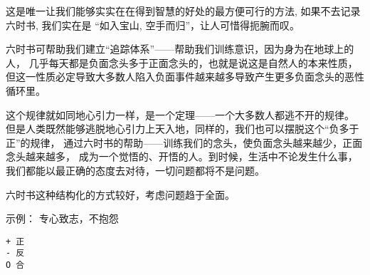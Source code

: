 \begin{tcolorbox}
这是唯一让我们能够实实在在得到智慧的好处的最方便可行的方法, 如果不去记录六时书, 
我们实在是 “如入宝山, 空手而归”，让人可惜得扼腕而叹。

六时书可帮助我们建立“追踪体系”——帮助我们训练意识，因为身为在地球上的人，
几乎每天都是负面念头多于正面念头的，也就是说这是自然人的本来性质，
但这一性质必定导致大多数人陷入负面事件越来越多导致产生更多负面念头的恶性循环里。

这个规律就如同地心引力一样，是一个定理——一个大多数人都逃不开的规律。
但是人类既然能够逃脱地心引力上天入地，同样的，我们也可以摆脱这个“负多于正”的规律，
通过六时书的帮助——训练我们的念头，使负面念头越来越少，正面念头越来越多，
成为一个觉悟的、开悟的人。到时候，生活中不论发生什么事，
我们都能以最正确的态度去对待，一切问题都将不是问题。
\end{tcolorbox}

六时书这种结构化的方式较好，考虑问题趋于全面。

示例： 专心致志，不抱怨

\begin{lstlisting}
+ 正
- 反
O 合
\end{lstlisting}

